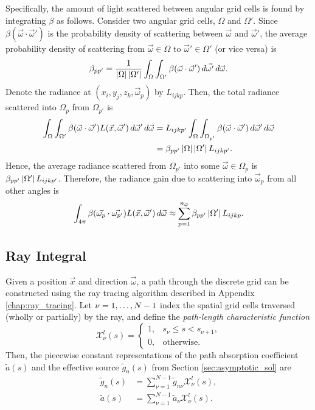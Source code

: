 Specifically, the amount of light scattered between angular grid cells is found by integrating $\beta$ as follows.
Consider two angular grid cells, $\Omega$ and $\Omega'$.
Since $\beta(\vec{\omega}\cdot\vec{\omega}')$ is the probability density of scattering between $\vec{\omega}$ and $\vec{\omega}'$, the average probability density of scattering from $\vec{\omega} \in \Omega$ to $\vec{\omega}' \in \Omega'$ (or vice versa) is
\begin{equation*}
  \beta_{pp'} = \frac{1}{\left| \Omega \right|\left| \Omega' \right|} \int_\Omega\int_{\Omega'}\beta(\vec{\omega}\cdot\vec{\omega}')\, d\vec{\omega'}\, d\vec{\omega}.
\end{equation*}
Denote the radiance at $(x_i, y_j, z_k, \vec{\omega}_p)$ by $L_{ijkp}$.
Then, the total radiance scattered into $\Omega_p$ from $\Omega_{p'}$ is
\begin{align*}
  \int_{\Omega}\int_{\Omega'}\beta(\vec{\omega} \cdot \vec{\omega}')L(\vec{x},\vec{\omega}')\, d\vec{\omega}'\, d\vec{\omega}
  &= L_{ijkp'} \int_\Omega\int_{\Omega_{p'}} \beta(\vec{\omega} \cdot \vec{\omega}')\, d\vec{\omega}'\, d\vec{\omega} \\
  &= \beta_{pp'}\left| \Omega \right|\left| \Omega' \right|L_{ijkp'}.
\end{align*}
Hence, the average radiance scattered from $\Omega_{p'}$ into some $\vec{\omega} \in \Omega_p$ is $\beta_{pp'}\left| \Omega' \right|L_{ijkp'}$.
Therefore, the radiance gain due to scattering into $\vec{\omega}_p$ from all other angles is
\begin{equation}
  \int_{4\pi}\beta(\vec{\omega_p}\cdot\vec{\omega_{p'}})L(\vec{x}, \vec{\omega}')\, d\vec{\omega} \approx \sum_{p=1}^{n_{\vec{\omega}}} \beta_{pp'}\left| \Omega' \right|L_{ijkp}.
  \label{eqn:scatter_integral}
\end{equation}

\subsection{Ray Integral}
Given a position $\vec{x}$ and direction $\vec{\omega}$, a path through the discrete grid can be constructed using the ray tracing algorithm described in Appendix \ref{chap:ray_tracing}.
Let $\nu=1,\ldots,N\nobreak-\nobreak1$ index the spatial grid cells traversed (wholly or partially) by the ray, and define the \textit{path-length characteristic function}
\begin{equation*}
  \mathcal{X}^l_\nu(s) = \begin{cases}
    1, & s_\nu \leq s < s_{\nu+1}, \\
    0, & \mbox{otherwise}.
    \end{cases}
\end{equation*}
Then, the piecewise constant representations of the path absorption coefficient $\tilde{a}(s)$ and the effective source $\tilde{g}_n(s)$ from Section \ref{sec:asymptotic_sol} are
\begin{align*}
  \tilde{g}_n(s) &= \sum_{\nu=1}^{N-1}\tilde{g}_{n\nu}\mathcal{X}^l_\nu(s), \\
  \tilde{a}(s) &= \sum_{\nu=1}^{N-1}\tilde{a}_{\nu}\mathcal{X}^l_\nu(s).
\end{align*}

